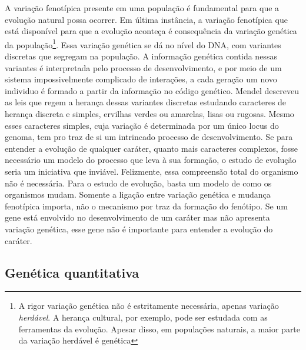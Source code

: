 \begin{refsection}
A variação fenotípica presente em uma população é fundamental para que a
evolução natural possa ocorrer. Em última instância, a variação fenotípica que
está disponível para que a evolução aconteça é consequência da variação
genética da população\footnote{A rigor variação genética não é estritamente
necessária, apenas variação \textit{herdável}. A herança cultural, por exemplo, pode
ser estudada com as ferramentas da evolução. Apesar disso, em populações
naturais, a maior parte da variação herdável é genética}. Essa variação
genética se dá no nível do DNA, com variantes discretas que segregam na
população. A informação genética contida nessas variantes é interpretada pelo
processo de desenvolvimento, e por meio de um sistema impossivelmente
complicado de interações, a cada geração um novo individuo é formado a partir
da informação no código genético. Mendel descreveu as leis que regem a herança
dessas variantes discretas estudando caracteres de herança discreta e simples,
ervilhas verdes ou amarelas, lisas ou rugosas. Mesmo esses caracteres simples,
cuja variação é determinada por um único locus do genoma, tem pro traz de si
um intrincado processo de desenvolvimento. Se para entender a evolução de
qualquer caráter, quanto mais caracteres complexos, fosse necessário um modelo
do processo que leva à sua formação, o estudo de evolução seria um iniciativa
que inviável. Felizmente, essa compreensão total do organismo não é
necessária. Para o estudo de evolução, basta um modelo de como os organismos
mudam. Somente a ligação entre variação genética e mudança fenotípica importa,
não o mecanismo por traz da formação do fenótipo. Se um gene está envolvido no
desenvolvimento de um caráter mas não apresenta variação genética, esse gene
não é importante para entender a evolução do caráter.

\subsection{Genética quantitativa} 


\end{refsection}
